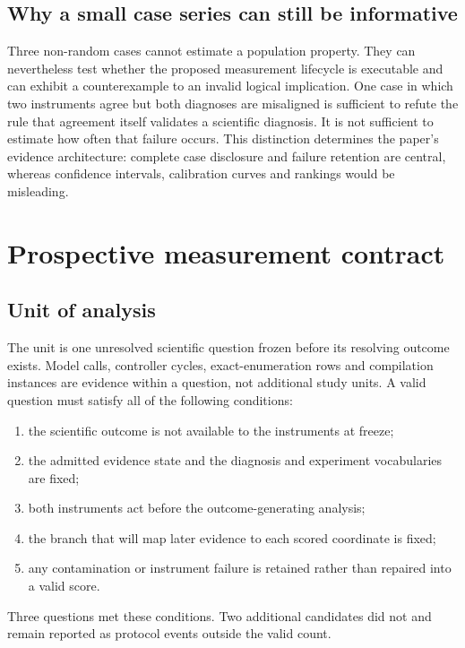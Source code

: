 \documentclass[10pt]{article}
\begin{document}
\subsection{Why a small case series can still be informative}

Three non-random cases cannot estimate a population property. They can nevertheless test whether the proposed measurement lifecycle is executable and can exhibit a counterexample to an invalid logical implication. One case in which two instruments agree but both diagnoses are misaligned is sufficient to refute the rule that agreement itself validates a scientific diagnosis. It is not sufficient to estimate how often that failure occurs. This distinction determines the paper's evidence architecture: complete case disclosure and failure retention are central, whereas confidence intervals, calibration curves and rankings would be misleading.

\section{Prospective measurement contract}

\subsection{Unit of analysis}

The unit is one unresolved scientific question frozen before its resolving outcome exists. Model calls, controller cycles, exact-enumeration rows and compilation instances are evidence within a question, not additional study units. A valid question must satisfy all of the following conditions:

\begin{enumerate}
\item the scientific outcome is not available to the instruments at freeze;
\item the admitted evidence state and the diagnosis and experiment vocabularies are fixed;
\item both instruments act before the outcome-generating analysis;
\item the branch that will map later evidence to each scored coordinate is fixed;
\item any contamination or instrument failure is retained rather than repaired into a valid score.
\end{enumerate}

Three questions met these conditions. Two additional candidates did not and remain reported as protocol events outside the valid count.
\end{document}
